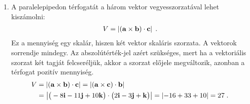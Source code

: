 \begin{enumerate}[label=\alph*)]
   \item A paralelepipedon térfogatát a három vektor vegyesszorzatával lehet kiszámolni:
   \begin{align}
    V=\left\lvert(\mathbf{a}\times\mathbf{b})\cdot\mathbf{c}\right\rvert\;.
   \end{align}
   Ez a mennyiség egy skalár,  hiszen két vektor skaláris szorzata. A vektorok sorrendje mindegy. Az abszolútérték-jel azért szükséges, mert ha a vektoriális szorzat két tagját felcseréljük, akkor a szorzat előjele megváltozik, azonban a térfogat pozitív mennyiség.
   \begin{align}
    V
     &=\left\lvert(\mathbf{a}\times\mathbf{b})\cdot\mathbf{c}\right\rvert
      =\left\lvert(\mathbf{a}\times\mathbf{c})\cdot\mathbf{b}\right\rvert\nonumber
    \\
     &=\left\lvert\big(-8\mathbf{i}-11\mathbf{j}+10\mathbf{k}\big)\cdot\big(2\mathbf{i}-3\mathbf{j}+\mathbf{k}\big)\right\rvert
      =\left\lvert-16+33+10\right\rvert
      =27\;.
   \end{align}

 \end{enumerate}

\fi